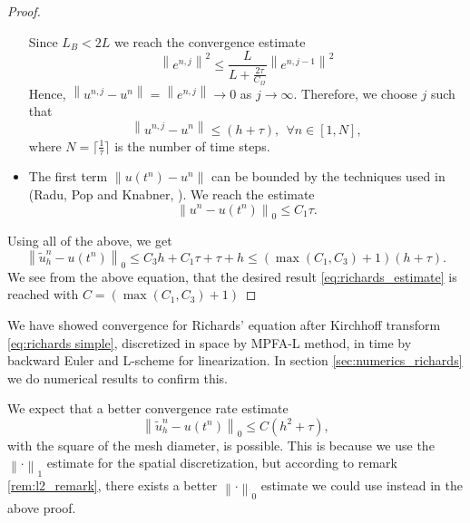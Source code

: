\documentclass[../Main/main.tex]{subfiles}
\begin{document}
\begin{proof}
\begin{itemize}
		Since $L_B < 2L$ we reach the convergence estimate
		\begin{equation}
\left \|e^{n,j}\right \|^2 \leq \frac{L}{L+\frac{2\tau}{C_{\Omega}}}\left \|e^{n,j-1}\right \|^2
		\end{equation}
		Hence, $\left \| u^{n,j}-u^n\right \| = \left \| e^{n,j}\right \|\rightarrow 0$ as $j\rightarrow \infty$. Therefore, we choose $j$ such that
		\begin{equation*}
			\left \| u^{n,j}-u^n\right \|\leq (h+\tau), \ \ \forall n\in [1,N],
		\end{equation*}
		where $N=\lceil\frac{1}{\tau}\rceil $ is the number of time steps.
		\item The first term $\left \| u(t^n)-u^n\right \|$ can be bounded by the techniques used in (Radu, Pop and Knabner, \cite{FlorinTimeConvergence}). We reach the estimate
		\begin{equation}
			\left \| u^n-u(t^n)\right \|_0 \leq C_1 \tau.
		\end{equation}
		
		\end{itemize}
	Using all of the above, we get
	\begin{equation}
		\left \|\tilde{u}_h^{n}-u(t^n)\right \|_0 \leq C_3 h + C_1 \tau + \tau + h \leq (\max(C_1,C_3)+1)(h+\tau).
	\end{equation}
	We see from the above equation, that the desired result \eqref{eq:richards_estimate} is reached with $C=(\max(C_1,C_3)+1)$
	\end{proof}
	We have showed convergence for Richards' equation after Kirchhoff transform \eqref{eq:richards simple},  discretized in space by MPFA-L method, in time by backward Euler and L-scheme for linearization. In section \ref{sec:numerics_richards} we do numerical results to confirm this.
	\begin{remark}
		We expect that a better convergence rate estimate 
		\begin{equation}
			\left \|\tilde{u}_h^{n}-u(t^n)\right \|_0 \leq C (h^2+\tau),
		\end{equation}
		with the square of the mesh diameter, is possible. This is because we use the $\left\|\cdot\right\|_1$ estimate for the spatial discretization, but according to remark \ref{rem:l2_remark}, there exists a better $\left\|\cdot\right\|_0$ estimate we could use instead in the above proof.
	\end{remark}
	
\end{document}
